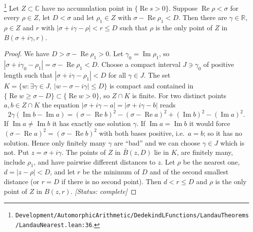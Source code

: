 \begin{lemma}[A point on the line $\operatorname{Re}s=\sigma$ with a unique nearest pole]\label{lem:E-nearest}
\footnote{\nolinkurl{Development/AutomorphicArithmetic/DedekindLFunctions/LandauTheorems/LandauNearest.lean:36}.}%
Let $Z\subset\mathbb C$ have no accumulation point in $\{\operatorname{Re}s>0\}$. Suppose
$\operatorname{Re}\rho<\sigma$ for every $\rho\in Z$, let $D<\sigma$ and let $\rho_1\in Z$ with $\sigma-\operatorname{Re}\rho_1<D$. Then
there are $\gamma\in\mathbb R$, $\rho\in Z$ and $r$ with
$|\sigma+i\gamma-\rho|<r\le D$ such that $\rho$ is the only point of $Z$ in
$B(\sigma+i\gamma,r)$.
\end{lemma}
\begin{proof}
We have $D>\sigma-\operatorname{Re}\rho_1>0$. Let $\gamma_0=\operatorname{Im}\rho_1$, so $|\sigma+i\gamma_0-\rho_1|=\sigma-\operatorname{Re}\rho_1<D$.
Choose a compact interval $J\ni\gamma_0$ of positive length such that
$|\sigma+i\gamma-\rho_1|<D$ for all $\gamma\in J$. The set
$K=\{w:\exists\gamma\in J,\ |w-\sigma-i\gamma|\le D\}$ is compact and contained in
$\{\operatorname{Re}w\ge\sigma-D\}\subset\{\operatorname{Re}w>0\}$, so $Z\cap K$ is finite. For two
distinct points $a,b\in Z\cap K$ the equation $|\sigma+i\gamma-a|=|\sigma+i\gamma-b|$ reads
\[
2\gamma(\operatorname{Im}b-\operatorname{Im}a)=(\sigma-\operatorname{Re}b)^{2}-(\sigma-\operatorname{Re}a)^{2}
+(\operatorname{Im}b)^{2}-(\operatorname{Im}a)^{2}.
\]
If $\operatorname{Im}a\neq\operatorname{Im}b$ it has exactly one solution $\gamma$. If
$\operatorname{Im}a=\operatorname{Im}b$ it would force
$(\sigma-\operatorname{Re}a)^{2}=(\sigma-\operatorname{Re}b)^{2}$ with both bases positive, i.e.\
$a=b$; so it has no solution. Hence only finitely many $\gamma$ are ``bad'' and we can choose
$\gamma\in J$ which is not. Put $z=\sigma+i\gamma$. The points of $Z$ in $\bar B(z,D)$ lie in $K$,
are finitely many, include $\rho_1$, and have pairwise different distances to $z$. Let $\rho$ be the
nearest one, $d=|z-\rho|<D$, and let $r$ be the minimum of $D$ and of the second smallest distance
(or $r=D$ if there is no second point). Then $d<r\le D$ and $\rho$ is the only point of $Z$ in
$B(z,r)$.
\textit{[Status: complete]}
\end{proof}

